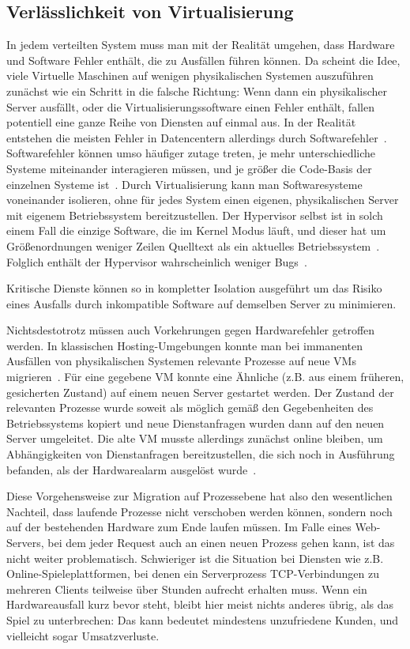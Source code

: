 \documentclass[draft,journal]{IEEEtran}
\begin{document}
\subsection{Verlässlichkeit von Virtualisierung}
In jedem verteilten System muss man mit der Realität umgehen, dass
Hardware und Software Fehler enthält, die zu Ausfällen führen
können. Da scheint die Idee, viele Virtuelle Maschinen auf wenigen
physikalischen Systemen auszuführen zunächst wie ein Schritt in die
falsche Richtung: Wenn dann ein physikalischer Server ausfällt, oder
die Virtualisierungssoftware einen Fehler enthält, fallen potentiell
eine ganze Reihe von Diensten auf einmal aus. In der Realität
entstehen die meisten Fehler in Datencentern allerdings durch
Softwarefehler~\cite{tanenbaum1992modern}. Softwarefehler können umso
häufiger zutage treten, je mehr unterschiedliche Systeme miteinander
interagieren müssen, und je größer die Code-Basis der einzelnen
Systeme ist~\cite{zellerprograms}. Durch Virtualisierung kann man
Softwaresysteme voneinander isolieren, ohne für jedes System einen
eigenen, physikalischen Server mit eigenem Betriebssystem
bereitzustellen. Der Hypervisor selbst ist in solch einem Fall die
einzige Software, die im Kernel Modus läuft, und dieser hat um
Größenordnungen weniger Zeilen Quelltext als ein aktuelles
Betriebssystem~\cite{tanenbaum1992modern}. Folglich enthält der
Hypervisor wahrscheinlich weniger Bugs~\cite{zellerprograms}.

Kritische Dienste können so in kompletter Isolation ausgeführt um das
Risiko eines Ausfalls durch inkompatible Software auf demselben Server
zu minimieren.

Nichtsdestotrotz müssen auch Vorkehrungen gegen Hardwarefehler
getroffen werden. In klassischen Hosting-Umgebungen konnte man bei
immanenten Ausfällen von physikalischen Systemen relevante Prozesse
auf neue VMs migrieren~\cite{hansen2004self}. Für eine gegebene VM
konnte eine Ähnliche (z.B. aus einem früheren, gesicherten Zustand)
auf einem neuen Server gestartet werden. Der Zustand der relevanten
Prozesse wurde soweit als möglich gemäß den Gegebenheiten des
Betriebssystems kopiert und neue Dienstanfragen wurden dann auf den
neuen Server umgeleitet. Die alte VM musste allerdings zunächst online
bleiben, um Abhängigkeiten von Dienstanfragen bereitzustellen, die
sich noch in Ausführung befanden, als der Hardwarealarm ausgelöst
wurde~\cite{clark2005live}.

Diese Vorgehensweise zur Migration auf Prozessebene hat also den
wesentlichen Nachteil, dass laufende Prozesse nicht verschoben werden
können, sondern noch auf der bestehenden Hardware zum Ende laufen
müssen. Im Falle eines Web-Servers, bei dem jeder Request auch an
einen neuen Prozess gehen kann, ist das nicht weiter
problematisch. Schwieriger ist die Situation bei Diensten wie
z.B. Online-Spieleplattformen, bei denen ein Serverprozess
TCP-Verbindungen zu mehreren Clients teilweise über Stunden aufrecht
erhalten muss. Wenn ein Hardwareausfall kurz bevor steht, bleibt hier
meist nichts anderes übrig, als das Spiel zu unterbrechen: Das kann
bedeutet mindestens unzufriedene Kunden, und vielleicht sogar
Umsatzverluste.
\end{document}
